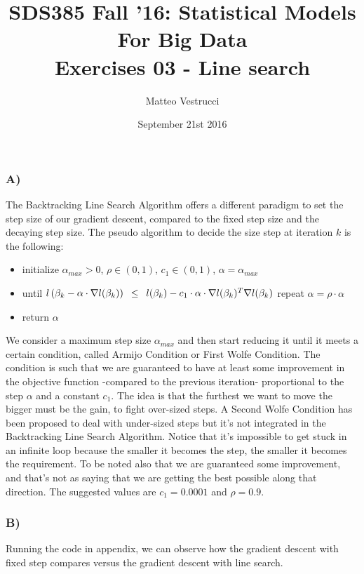 \documentclass{article}
\title{SDS385 Fall '16: Statistical Models For Big Data\\Exercises 03 - Line search}
\author{Matteo Vestrucci}
\date{September 21st 2016}
\begin{document}
\maketitle
\bigskip\bigskip\bigskip

\subsubsection*{A)}

The Backtracking Line Search Algorithm offers a different paradigm to set the step size of our gradient descent, compared to the fixed step size and the decaying step size. The pseudo algorithm to decide the size step at iteration $k$ is the following:

\begin{itemize}
\item initialize $\alpha_{max}>0$, $\rho \in (0,1)$, $c_1 \in (0,1)$, $\alpha=\alpha_{max}$
\item until $l\left(\beta_k-\alpha\cdot\nabla l(\beta_k)\right) \enskip\leq\enskip l(\beta_k)-c_1\cdot\alpha\cdot\nabla l(\beta_k)^T\nabla l(\beta_k)$ repeat $\alpha=\rho\cdot\alpha$ 
\item return $\alpha$
\end{itemize}

We consider a maximum step size $\alpha_{max}$ and then start reducing it until it meets a certain condition, called Armijo Condition or First Wolfe Condition. The condition is such that we are guaranteed to have at least some improvement in the objective function -compared to the previous iteration- proportional to the step $\alpha$ and a constant $c_1$. The idea is that the furthest we want to move the bigger must be the gain, to fight over-sized steps. A Second Wolfe Condition has been proposed to deal with under-sized steps but it's not integrated in the Backtracking Line Search Algorithm. Notice that it's impossible to get stuck in an infinite loop because the smaller it becomes the step, the smaller it becomes the requirement. To be noted also that we are guaranteed some improvement, and that's not as saying that we are getting the best possible along that direction. The suggested values are $c_1=0.0001$ and $\rho=0.9$.

\subsubsection*{B)}

Running the code in appendix, we can observe how the gradient descent with fixed step compares versus the gradient descent with line search.
\end{document}
